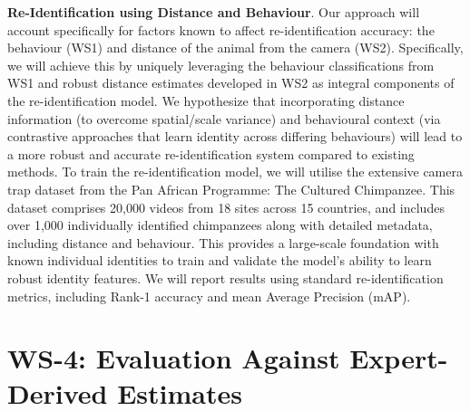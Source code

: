 \textbf{Re-Identiﬁcation using Distance and Behaviour}. Our approach will account specifically for factors known to affect re-identification accuracy: the behaviour (WS1) and distance of the animal from the camera (WS2). Specifically, we will achieve this by uniquely leveraging the behaviour classifications from WS1 and robust distance estimates developed in WS2 as integral components of the re-identification model. We hypothesize that incorporating distance information (to overcome spatial/scale variance) and behavioural context (via contrastive approaches that learn identity across differing behaviours) will lead to a more robust and accurate re-identification system compared to existing methods. To train the re-identification model, we will utilise the extensive camera trap dataset from the Pan African Programme: The Cultured Chimpanzee. This dataset comprises 20,000 videos from 18 sites across 15 countries, and includes over 1,000 individually identified chimpanzees along with detailed metadata, including distance and behaviour. This provides a large-scale foundation with known individual identities to train and validate the model’s ability to learn robust identity features. We will report results using standard re-identification metrics, including Rank-1 accuracy and mean Average Precision (mAP).


\section*{WS-4: Evaluation Against Expert-Derived Estimates}



